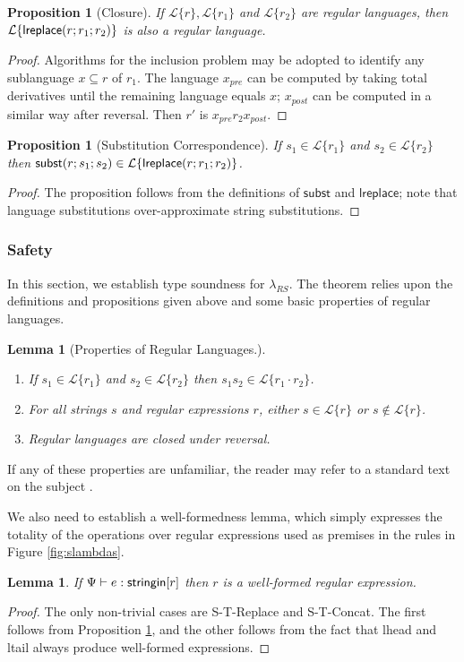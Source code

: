 \documentclass[9pt]{sig-alternate}
\newtheorem{lem}[thm]{Lemma}
\newtheorem{prop}[thm]{Proposition}
\theoremstyle{definition}
\newcommand{\Lagr}{\mathcal{L}}
\newcommand{\lang}[1]{\Lagr\{#1\}}
\newcommand{\lambdas}{\lambda_{RS}}
\newcommand{\stringin}[1]{{\sf stringin}[#1]}
\newcommand{\lsubst}[3]{{\sf subst}(#1;#2;#3)} %
\newcommand{\lreplace}[3]{{\sf lreplace}(#1; #2; #3)}
\newcommand{\sctx}{\Psi} %
\begin{document}
\begin{prop}[Closure] \label{thm:total}
  If $\lang{r}, \lang{r_1}$ and $\lang{r_2}$ are regular languages, then $\lang{\lreplace{r}{r_1}{r_2}}$ is also a regular language.
\end{prop}
\begin{proof}
Algorithms for the inclusion problem may be adopted to identify any sublanguage $x \subseteq r$ of $r_1$.
The language $x_{pre}$ can be computed by taking total derivatives until the remaining language
equals $x$; $x_{post}$ can be computed in a similar way after reversal.
Then $r'$ is $x_{pre}r_2x_{post}$.
\end{proof}

\begin{prop}[Substitution Correspondence] \label{thm:substcorrespondence}
  If $s_1 \in \lang{r_1}$ and $s_2 \in \lang{r_2}$ then $\lsubst{r}{s_1}{s_2} \in \lang{\lreplace{r}{r_1}{r_2}}$.
\end{prop}
\begin{proof}
The proposition follows from the definitions of $\textsf{subst}$ and $\textsf{lreplace}$; note that language substitutions over-approximate string substitutions.
\end{proof}

\subsubsection{Safety}

In this section, we establish type soundness for $\lambdas$.
The theorem relies upon the definitions and propositions given above and some basic properties of regular languages. 

\begin{lem}[Properties of Regular Languages.] \label{thm:regexprops}
~
\begin{enumerate}
\item 
If $s_1 \in \lang{r_1}$ and $s_2 \in \lang{r_2}$ then $s_1s_2 \in \lang{r_1\cdot r_2}$.
\item 
For all strings $s$ and regular expressions $r$, either $s \in \lang{r}$ or $s \not \in \lang{r}$.
\item 
Regular languages are closed under reversal.
\end{enumerate}
\end{lem}

If any of these properties are unfamiliar, the reader may refer to a standard text on the subject \cite{cinderella}.

We also need to establish a well-formedness lemma, which simply expresses the totality of the operations over regular expressions used as premises in the rules in Figure \ref{fig:slambdas}. 
\begin{lem}
  If $\sctx \vdash e : \stringin{r}$ then $r$ is a well-formed regular expression.
\end{lem}
\begin{proof}
  The only non-trivial cases are S-T-Replace and S-T-Concat. The first follows from Proposition \ref{thm:total}, and the other
  follows from the fact that lhead and ltail always produce well-formed expressions.
\end{proof}
\end{document}
